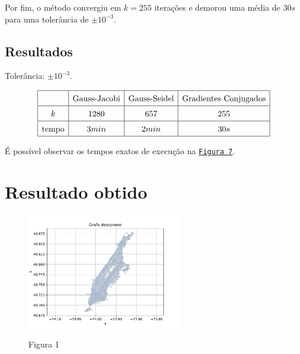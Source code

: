 \documentclass{article}
\begin{document}
    Por fim, o método convergiu em $k = 255$ iterações e demorou uma média de $30s$ para uma tolerância de $\pm 10^{-3}$.

    \hypertarget{3}{}

    \subsection{Resultados}

    Tolerância: $\pm 10^{-3}$.

    \[\renewcommand{\arraystretch}{1.5}
    \begin{array}{|c|c|c|c|}
        \hline
        & \text{Gauss-Jacobi} & \text{Gauss-Seidel} & \text{Gradientes Conjugados}\\
        \hline
        k & 1280 & 657 & 255\\
        \hline
        \text{tempo} & 3min & 2min & 30s\\
        \hline
    \end{array}\]

    É possível observar os tempos exatos de execução na \hyperlink{4}{\texttt{Figura 7}}.

    \section{Resultado obtido}

    \begin{figure}[ht]
        \centering
        \includegraphics[width=0.6\textwidth, trim={0 .3cm 0 .9cm},clip]{../figs/fig1.pdf}
        
        Figura 1
    \end{figure}

    \newpage
\end{document}

